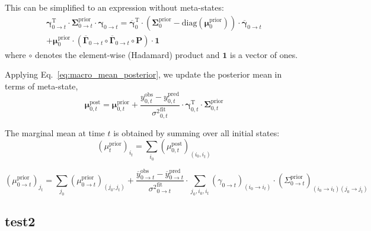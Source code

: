 \documentclass[pdflatex,sn-mathphys-num]{sn-jnl}%
\theoremstyle{thmstyleone}%
\theoremstyle{thmstyletwo}%
\theoremstyle{thmstylethree}%
\begin{document}
This can be simplified to an expression without meta-states:
\begin{multline}
	\mathbf{\gamma}^{\mathrm{T}}_{0 \rightarrow t} \cdot \mathbf{\Sigma}^{\mathrm{prior}}_{0 \rightarrow t} \cdot \mathbf{\gamma}_{0 \rightarrow t} = 
	\overline{\mathbf{\gamma}}_{0}^{\mathrm{T}} \cdot 
	\left( \mathbf{\Sigma}^{\mathrm{prior}}_{0} - \mathrm{diag}(\mathbf{\mu}^{\mathrm{prior}}_0) \right) \cdot 
	\overline{\mathbf{\gamma}}_{0 \rightarrow t} \\
	+ \mathbf{\mu}^{\mathrm{prior}}_0 \cdot \left( \overline{\mathbf{\Gamma}}_{0 \rightarrow t} \circ \overline{\mathbf{\Gamma}}_{0 \rightarrow t} \circ \mathbf{P} \right) \cdot \mathbf{1}
	\label{eq:simplified_meta_state}
\end{multline}
where \( \circ \) denotes the element-wise (Hadamard) product and \( \mathbf{1} \) is a vector of ones.

Applying Eq.~\ref{eq:macro_mean_posterior}, we update the posterior mean in terms of meta-state,
\begin{equation}
	\mathbf{\mu}^{\mathrm{post}}_{0, t} = \mathbf{\mu}^{\mathrm{prior}}_{0, t} + 
	\frac{y^{\mathrm{obs}}_{0, t} - y^{\mathrm{pred}}_{0, t}}{{\sigma^2}^{\mathrm{fit}}_{0, t}} 
	\cdot \mathbf{\gamma}^{\mathrm{T}}_{0, t} \cdot \mathbf{\Sigma}^{\mathrm{prior}}_{0, t}
	\label{eq:meta_posterior_mean_update}
\end{equation}

The marginal mean at time \( t \) is obtained by summing over all initial states:
\begin{equation}
	(\mu^{\mathrm{prior}}_{t})_{i_t} = \sum_{i_0} (\mu^{\mathrm{post}}_{0, t})_{(i_0, i_t)}
	\label{eq:marginal_prior_mean}
\end{equation}

\begin{equation}
	(\mu^{\mathrm{prior}}_{0 \rightarrow t})_{j_{t}} = 
	\sum_{j_0} (\mu^{\mathrm{prior}}_{0 \rightarrow t})_{(j_0, j_{t})} 
	+ \frac{\overline{y}^{\mathrm{obs}}_{0 \rightarrow t} - \overline{y}^{\mathrm{pred}}_{0 \rightarrow t}}{{\sigma^2}^{\mathrm{fit}}_{0 \rightarrow t}} \cdot 
	\sum_{j_0, i_0, i_{t}} (\gamma_{0 \rightarrow t})_{(i_0 \rightarrow i_{t})} \cdot (\Sigma^{\mathrm{prior}}_{0 \rightarrow t})_{(i_0 \rightarrow i_{t})(j_0 \rightarrow j_{t})}
	\label{eq:mu_prior_update_0_to_t}
\end{equation}


\subsection{test2}
\end{document}
